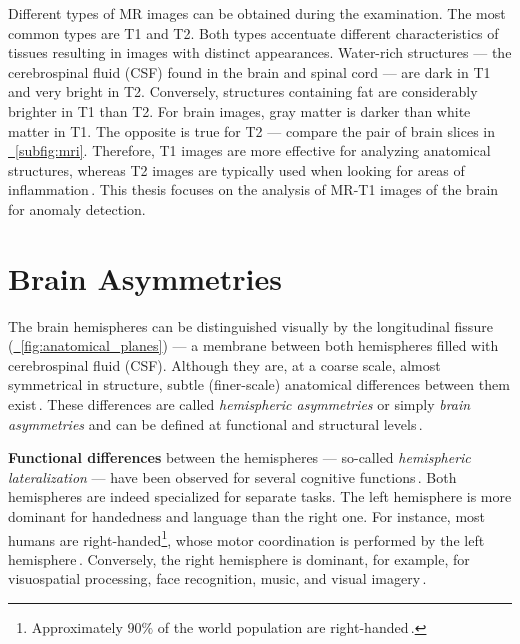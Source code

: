 Different types of MR images can be obtained during the examination. The most common types are T1 and T2. Both types accentuate different characteristics of tissues resulting in images with distinct appearances. Water-rich structures --- \eg the cerebrospinal fluid (CSF) found in the brain and spinal cord --- are dark in T1 and very bright in T2. Conversely, structures containing fat are considerably brighter in T1 than T2. For brain images, gray matter is darker than white matter in T1. The opposite is true for T2 --- compare the pair of brain slices in \hyperref[subfig:mri]{\fig~\ref{subfig:mri}}. Therefore, T1 images are more effective for analyzing anatomical structures, whereas T2 images are typically used when looking for areas of inflammation\,\cite{Liu-2014-SurveyBrainTumorSegmentation,Guo-2015-AutomatedLesionDetectionOnMRI}. This thesis focuses on the analysis of MR-T1 images of the brain for anomaly detection.



\section{Brain Asymmetries}
\label{sec:brain_asymmetries}
The brain hemispheres can be distinguished visually by the longitudinal fissure (\hyperref[fig:anatomical_planes]{\fig~\ref{fig:anatomical_planes}}) --- a membrane between both hemispheres filled with cerebrospinal fluid (CSF). Although they are, at a coarse scale, almost symmetrical in structure, subtle (finer-scale) anatomical differences between them exist\,\cite{Tortora-2018-Book-Principles,Baars-2013-Book-FundamentalsNeuroscience,Palmer-2004-Science-Symmetry}. These differences are called \emph{hemispheric asymmetries} or simply \emph{brain asymmetries} and can be defined at functional and structural levels\,\cite{Ocklenburg-2012-HemisphericAsymmetries}.

\textbf{Functional differences} between the hemispheres --- so-called \emph{hemispheric lateralization} --- have been observed for several cognitive functions\,\cite{Corballis-2009-AsymmetryEvolution}. Both hemispheres are indeed specialized for separate tasks. The left hemisphere is more dominant for handedness and language than the right one. For instance, most humans are right-handed\footnote{Approximately $90\%$ of the world population are right-handed\,\cite{Corballis-2009-AsymmetryEvolution,Toga-2009-BrainAsymmetry}.}, whose motor coordination is performed by the left hemisphere\,\cite{Corballis-2009-AsymmetryEvolution,Toga-2009-BrainAsymmetry}. Conversely, the right hemisphere is dominant, for example, for visuospatial processing, face recognition, music, and visual imagery\,\cite{Vogel-2003-CerebralLateralization,Kalavathi-2017-ReviewBrainSymmetries}.

